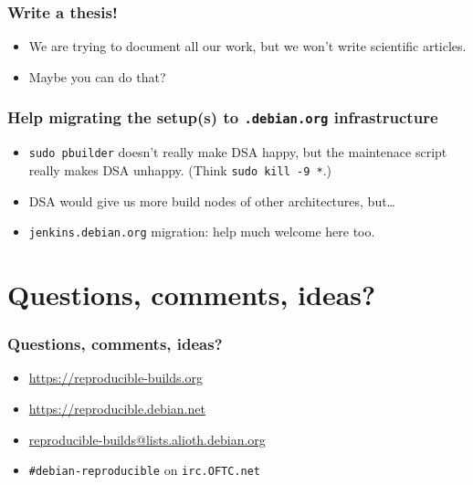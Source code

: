 \documentclass[14pt]{beamer}
\begin{document}
\begin{frame}
 \frametitle{Write a thesis!}

 \begin{itemize}
  \item We are trying to document all our work, but we won't write scientific articles.
  \item Maybe you can do that?
 \end{itemize}
\end{frame}

\begin{frame}
 \frametitle{Help migrating the setup(s) to \texttt{.debian.org} infrastructure}

 \begin{itemize}
  \item \texttt{sudo pbuilder} doesn't really make DSA happy, but the
  maintenace script really makes DSA unhappy. (Think \texttt{sudo kill -9 *}.)
  \item DSA would give us more build nodes of other architectures, but…
  \item<2> \texttt{jenkins.debian.org} migration: help much welcome here too.  
 \end{itemize}
\end{frame}


\section{Questions, comments, ideas?}


\begin{frame}
 \frametitle{Questions, comments, ideas?}

 \begin{itemize}
  \item \url{https://reproducible-builds.org}
  \item \url{https://reproducible.debian.net}
  \item \href{mailto:reproducible-builds@lists.alioth.debian.org}{reproducible-builds@lists.alioth.debian.org}
  \item \texttt{\#debian-reproducible} on \texttt{irc.OFTC.net}
 \end{itemize}
\end{frame}
\end{document}
